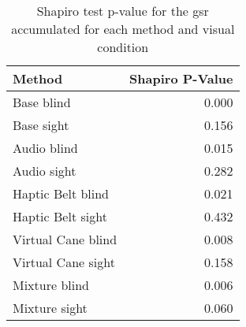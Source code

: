 
\begin{table}[!htb]
\centering
\caption{Shapiro test p-value for the gsr accumulated for each method and visual condition}
\label{tab:shapiro_gsr_sum}
\begin{tabular}{lr}
\toprule
            Method &  Shapiro P-Value \\
\midrule
        Base blind &            0.000 \\
        Base sight &            0.156 \\
       Audio blind &            0.015 \\
       Audio sight &            0.282 \\
 Haptic Belt blind &            0.021 \\
 Haptic Belt sight &            0.432 \\
Virtual Cane blind &            0.008 \\
Virtual Cane sight &            0.158 \\
     Mixture blind &            0.006 \\
     Mixture sight &            0.060 \\
\bottomrule
\end{tabular}
\end{table}


